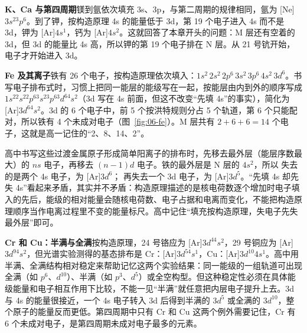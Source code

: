 
\textbf{K、Ca 与第四周期}\quad 镁到氩依次填充 3s、3p，与第二周期的规律相同，氩为 [Ne]$3s^23p^6$。到了钾，按构造原理 4s 的能量低于 3d，第 19 个电子进入 4s 而不是 3d，钾为 [Ar]$4s^1$，钙为 [Ar]$4s^2$。这就回答了本章开头的问题：M 层还有空着的 3d，但 3d 的能量比 4s 高，所以钾的第 19 个电子排在 N 层。从 21 号钪开始，电子才开始进入 3d。

\textbf{Fe 及其离子}\quad 铁有 26 个电子，按构造原理依次填入：$1s^2\,2s^2\,2p^6\,3s^2\,3p^6\,4s^2\,3d^6$。书写电子排布式时，习惯上把同一能层的能级写在一起，按能层由内到外的顺序写成 $1s^22s^22p^63s^23p^63d^64s^2$（3d 写在 4s 前面，但这不改变“先填 4s”的事实），简化为 [Ar]$3d^64s^2$。3d 的 6 个电子中，前 5 个按洪特规则分占 5 个轨道，第 6 个只能配对，所以铁有 4 个未成对电子（图~\ref{fig:06-fe}）。M 层共有 $2+6+6=14$ 个电子，这就是高一记住的“2、8、14、2”。

高中书写这些过渡金属原子形成简单阳离子的排布时，先移去最外层（能层序数最大）的 $ns$ 电子，再移去 $(n-1)d$ 电子。铁的最外层是 N 层的 $4s^2$，所以  失去的是两个 4s 电子，为 [Ar]$3d^6$； 再失去一个 3d 电子，为 [Ar]$3d^5$。“先填 4s 却先失 4s”看起来矛盾，其实并不矛盾：构造原理描述的是核电荷数逐个增加时电子填入的先后，能级的相对能量会随核电荷数、电子占据和电离而变化，不能把构造原理顺序当作电离过程里不变的能量标尺。高中记住“填充按构造原理，失电子先失最外层”即可。

\textbf{Cr 和 Cu：半满与全满}\quad 按构造原理，24 号铬应为 [Ar]$3d^44s^2$，29 号铜应为 [Ar]$3d^94s^2$，但光谱实验测得的基态排布是 Cr：[Ar]$3d^54s^1$，Cu：[Ar]$3d^{10}4s^1$。高中用半满、全满结构相对稳定来帮助记忆这两个实验结果：同一能级的一组轨道可出现全满（如 $p^6$、$d^{10}$）、半满（如 $p^3$、$d^5$）或全空构型。但这种稳定性必须在具体能级能量和电子相互作用下比较，不能一见“半满”就任意把内层电子提升上去。3d 与 4s 的能量很接近，一个 4s 电子转入 3d 后得到半满的 $3d^5$ 或全满的 $3d^{10}$，整个原子的能量反而更低。第四周期中只有 Cr 和 Cu 这两个例外需要记住，Cr 有 6 个未成对电子，是第四周期未成对电子最多的元素。

